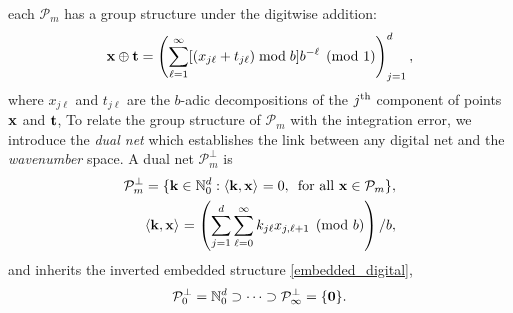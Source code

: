  each $\mathcal{P}_m$ has a group structure under the digitwise addition:
\[
\boldsymbol{\mathbf{x}} \oplus \boldsymbol{\mathbf{t}} = \left(\sum_{\ell=1}^{\infty} [(x_{j\ell} + t_{j\ell}) \bmod b] b^{-\ell} \pmod{1} \right)_{j=1}^d,
\]
where $x_{j\ell}$ and $t_{j\ell}$ are the $b$-adic decompositions of the $j^{\rm th}$ component of points $\boldsymbol{\mathbf{x}}$ and $\boldsymbol{\mathbf{t}}$,
To relate the group structure of $\mathcal{P}_m$ with the integration error, we introduce the \emph{dual net} which establishes the link between any digital net and the \emph{wavenumber} space. A dual net $\mathcal{P}_m^\perp$ is
\begin{align*}
\mathcal{P}_m^\perp=\{\boldsymbol{\mathbf{k}}\in\mathbb{N}_0^d:\left \langle \boldsymbol{\mathbf{k}}, \boldsymbol{\mathbf{x}} \right \rangle_{{}}=0,\, \text{ for all } \boldsymbol{\mathbf{x}}\in\mathcal{P}_m\}, \\
\left \langle \boldsymbol{\mathbf{k}}, \boldsymbol{\mathbf{x}} \right \rangle_{{}} = \left(\sum_{j=1}^{d} \sum_{\ell=0}^{\infty} k_{j\ell}x_{j,\ell+1}  \pmod b \right)/b,
\end{align*}
and inherits the inverted embedded structure \eqref{embedded_digital},
\begin{equation}\label{dual_net_structure}
\mathcal{P}_0^\perp=\mathbb{N}_0^d\supset\dots\supset\mathcal{P}_\infty^\perp=\{\boldsymbol{\mathbf{0}}\}.
\end{equation}

